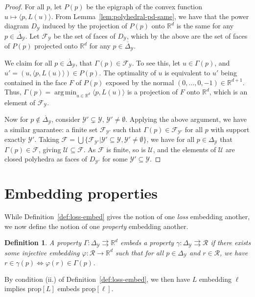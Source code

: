 \documentclass[12pt]{article}
\newcommand{\reals}{\mathbb{R}}
\newcommand{\prop}[1]{\mathrm{prop}[#1]}
\newcommand{\simplex}{\Delta_\Y}
\newcommand{\F}{\mathcal{F}}
\newcommand{\R}{\mathcal{R}}
\newcommand{\U}{\mathcal{U}}
\newcommand{\Y}{\mathcal{Y}}
\newcommand{\inprod}[2]{\langle #1, #2 \rangle}%
\newcommand{\inter}[1]{\mathring{#1}}%
\newcommand{\toto}{\rightrightarrows}
\DeclareMathOperator*{\argmin}{arg\,min}
\newtheorem{definition}{Definition}
\begin{document}
\polyhedralrangegamma*
\begin{proof}
	For all $p$, let $P(p)$ be the epigraph of the convex function $u\mapsto \inprod{p}{L(u)}$.
	From Lemma~\ref{lem:polyhedral-pd-same}, we have that the power diagram $D_\Y$ induced by the projection of $P(p)$ onto $\reals^d$ is the same for any $p\in\inter\simplex$.
	Let $\F_\Y$ be the set of faces of $D_\Y$, which by the above are the set of faces of $P(p)$ projected onto $\reals^d$ for any $p\in\inter\simplex$.
	
	We claim for all $p\in\inter\simplex$, that $\Gamma(p) \in \F_\Y$.
	To see this, let $u \in \Gamma(p)$, and $u' = (u,\inprod{p}{L(u)}) \in P(p)$.
	The optimality of $u$ is equivalent to $u'$ being contained in the face $F$ of $P(p)$ exposed by the normal $(0,\ldots,0,-1)\in\reals^{d+1}$.
	Thus, $\Gamma(p) = \argmin_{u\in\reals^d} \inprod{p}{L(u)}$ is a projection of $F$ onto $\reals^d$, which is an element of $\F_\Y$.
	
	Now for $p \not \in \inter{\simplex}$, consider $\Y'\subsetneq \Y$, $\Y'\neq\emptyset$.
	Applying the above argument, we have a similar guarantee: a finite set $\F_{\Y'}$ such that $\Gamma(p) \in \F_{\Y'}$ for all $p$ with support exactly $\Y'$.
	Taking $\F = \bigcup\{\F_{\Y'} | \Y'\subseteq\Y, \Y'\neq\emptyset\}$, we have for all $p\in\simplex$ that $\Gamma(p) \in \F$, giving $\U \subseteq \F$.
	As $\F$ is finite, so is $\U$, and the elements of $\U$ are closed polyhedra as faces of $D_{\Y'}$ for some $\Y'\subseteq\Y$.
\end{proof}

\iffalse
\section{Embedding properties}\label{app:embed-props}

While Definition~\ref{def:loss-embed} gives the notion of one \emph{loss} embedding another, we now define the notion of one \emph{property} embedding another.
\begin{definition}\label{def:prop-embed}
	A property $\Gamma : \simplex \toto \reals^d$ embeds a property $\gamma:\simplex \toto \R$ if there exists some injective embedding $\varphi:\R \to \reals^d$ such that for all $p \in \simplex$ and $r \in \R$, we have $r \in \gamma(p) \iff \varphi(r) \in \Gamma(p)$.
\end{definition}

By condition (ii.) of Definition~\ref{def:loss-embed}, we then have $L$ embedding $\ell$ implies $\prop{L}$ embeds $\prop{\ell}$.
\end{document}
